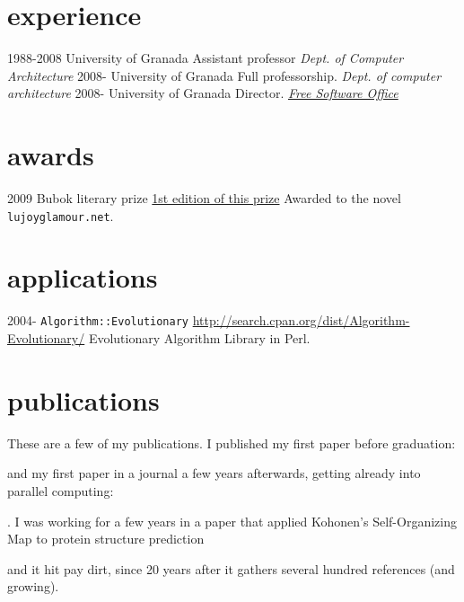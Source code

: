 \documentclass[]{friggeri-cv}
\begin{document}
\section{experience}

\begin{entrylist}
  \entry
    {1988-2008}
    {University of Granada}
    {Assistant professor}
    {\emph{Dept. of Computer Architecture}}
  \entry
    {2008-}
    {University of Granada}
    {Full professorship.}
    {\emph{Dept. of computer architecture}}
    \entry
    {2008-}
    {University of Granada}
    {Director.}
    {\href{http://osl.ugr.es}{\emph{Free Software Office}}}
\end{entrylist}

\section{awards}
\begin{entrylist}
 \entry
    {2009}
    {Bubok literary prize}
    {\href{http://cultura.elpais.com/cultura/2009/05/06/actualidad/1241560804_850215.html}{1st
        edition of this prize}}
    {Awarded to the novel {\tt lujoyglamour.net}.}
\end{entrylist}


\section{applications}

\begin{entrylist}
  \entry
    {2004-}
    {{\tt Algorithm::Evolutionary}}
    {\href{http://search.cpan.org/dist/Algorithm-Evolutionary/}{http://search.cpan.org/dist/Algorithm-Evolutionary/}}
    {Evolutionary Algorithm Library in Perl.}

\end{entrylist}

\section{publications}

These are a few of my publications. I published my first paper before
graduation: 

\cite{merelo88} 
and my first paper in a journal a few years
afterwards, getting already into parallel computing:

\cite{parallel90}. 
I was working for a few years in a paper that
applied Kohonen's Self-Organizing Map to protein structure prediction

\cite{jjproteng} 
and it hit pay dirt, since 20 years after it gathers
several hundred references (and growing).

\end{document}
